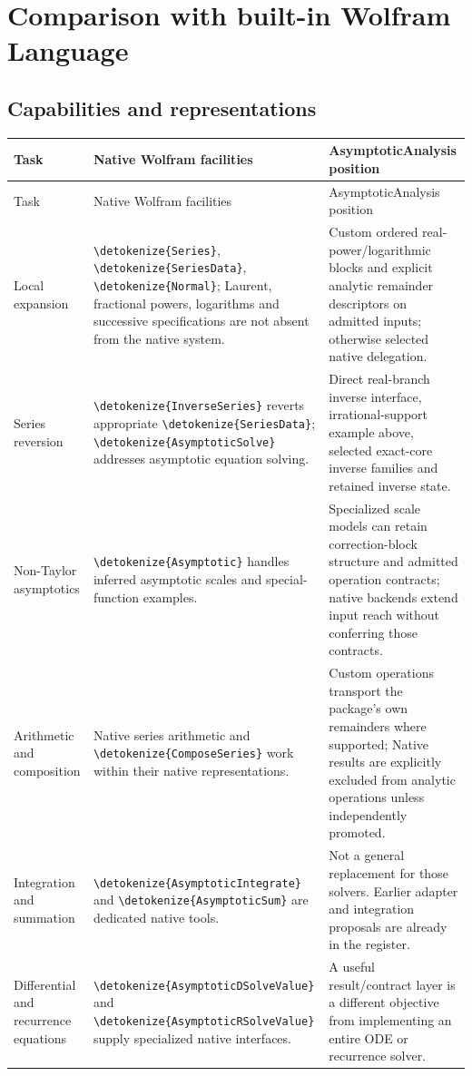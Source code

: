 \documentclass[11pt]{article}
\newcommand{\code}[1]{{\ttfamily\expandafter\nolinkurl\expandafter{\detokenize{#1}}}}
\begin{document}
\section{Comparison with built-in Wolfram Language}

\subsection{Capabilities and representations}
\begin{longtable}{@{}p{}p{}p{}@{}}
\toprule Task & Native Wolfram facilities & AsymptoticAnalysis position \\
\midrule\endfirsthead
\toprule Task & Native Wolfram facilities & AsymptoticAnalysis position \\
\midrule\endhead
Local expansion & \code{Series}, \code{SeriesData}, \code{Normal}; Laurent, fractional powers, logarithms and successive specifications are not absent from the native system. & Custom ordered real-power/logarithmic blocks and explicit analytic remainder descriptors on admitted inputs; otherwise selected native delegation. \\
Series reversion & \code{InverseSeries} reverts appropriate \code{SeriesData}; \code{AsymptoticSolve} addresses asymptotic equation solving. & Direct real-branch inverse interface, irrational-support example above, selected exact-core inverse families and retained inverse state. \\
Non-Taylor asymptotics & \code{Asymptotic} handles inferred asymptotic scales and special-function examples. & Specialized scale models can retain correction-block structure and admitted operation contracts; native backends extend input reach without conferring those contracts. \\
Arithmetic and composition & Native series arithmetic and \code{ComposeSeries} work within their native representations. & Custom operations transport the package's own remainders where supported; Native results are explicitly excluded from analytic operations unless independently promoted. \\
Integration and summation & \code{AsymptoticIntegrate} and \code{AsymptoticSum} are dedicated native tools. & Not a general replacement for those solvers. Earlier adapter and integration proposals are already in the register. \\
Differential and recurrence equations & \code{AsymptoticDSolveValue} and \code{AsymptoticRSolveValue} supply specialized native interfaces. & A useful result/contract layer is a different objective from implementing an entire ODE or recurrence solver. \\

\end{longtable}
\end{document}
